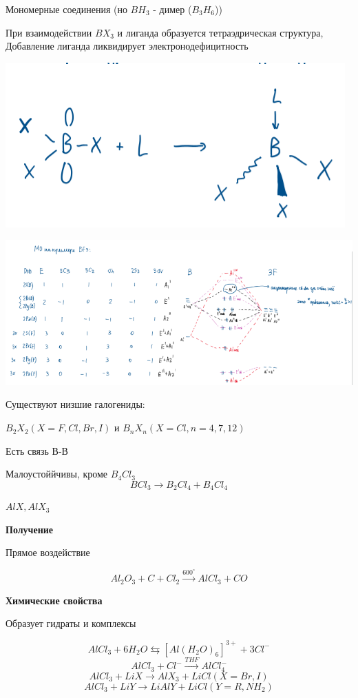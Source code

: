 Мономерные соединения (но $BH_3$ - димер ($B_3H_6$))

При взаимодействии $BX_3$ и лиганда образуется тетраэдрическая структура,\\
Добавление лиганда ликвидирует электронодефицитность

\includegraphics{images/11v10.png}

\includegraphics{images/11v11.png}


Существуют низшие галогениды:

$B_2X_2 (X=F,Cl,Br,I)$ и $B_nX_n (X = Cl, n = 4,7,12)$

Есть связь В-В

Малоустоййчивы, кроме $B_4Cl_3$
$$BCl_3 \rightarrow B_2Cl_4 + B_4Cl_4$$

$AlX, AlX_3$

\textbf{Получение}

Прямое воздействие

$$Al_2O_3 + C + Cl_2 \xrightarrow{600^{\circ}} AlCl_3 + CO$$

\textbf{Химические свойства}

Образует гидраты и комплексы 

$$AlCl_3 + 6H_2O \leftrightarrows [Al(H_2O)_6]^{3+} + 3Cl^-$$
$$AlCl_3 + Cl^- \xrightarrow{THF} AlCl_4^-$$
$$AlCl_3 + LiX \rightarrow AlX_3 + LiCl (X = Br, I)$$
$$AlCl_3 + LiY \rightarrow LiAlY + LiCl (Y=R,NH_2)$$

